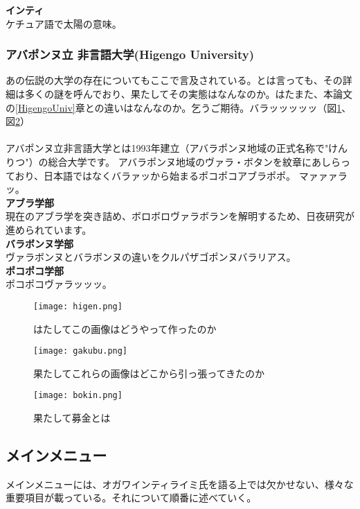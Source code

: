 {\large{\bf インティ}}\\
ケチュア語で太陽の意味。\\

\subsubsection{アバポンヌ立 非言語大学(Higengo University)}
あの伝説の大学の存在についてもここで言及されている。とは言っても、その詳細は多くの謎を呼んでおり、果たしてその実態はなんなのか。はたまた、本論文の\ref{HigengoUniv}章との違いはなんなのか。乞うご期待。バラッッッッッ（図\ref{higen}、図\ref{gakubu}）\\
 \\
アバポンヌ立非言語大学とは1993年建立（アバラポンヌ地域の正式名称で"けんりつ"）の総合大学です。 アバラポンヌ地域のヴァラ・ボタンを紋章にあしらっており、日本語ではなくバラァッから始まるポコポコアブラポポ。 マァァァラッ。\\

{\large{\bf アブラ学部}}\\
現在のアブラ学を突き詰め、ボロボロヴァラボランを解明するため、日夜研究が進められています。\\

{\large{\bf バラボンヌ学部}}\\
ヴァラボンヌとバラボンヌの違いをクルパザゴポンヌバラリアス。\\

{\large{\bf ポコポコ学部}}\\
ポコポコヴァラッッッ。\\

\begin{figure}[H]
  \centering
  \texttt{[image: higen.png]}
  \caption{はたしてこの画像はどうやって作ったのか}
\label{higen}
\end{figure}

\begin{figure}[H]
  \centering
  \texttt{[image: gakubu.png]}
  \caption{果たしてこれらの画像はどこから引っ張ってきたのか}
\label{gakubu}
\end{figure}

\begin{figure}[H]
  \centering
  \texttt{[image: bokin.png]}
  \caption{果たして募金とは}
\label{bokin}
\end{figure}

\subsection{メインメニュー}
メインメニューには、オガワインティライミ氏を語る上では欠かせない、様々な重要項目が載っている。それについて順番に述べていく。\\

